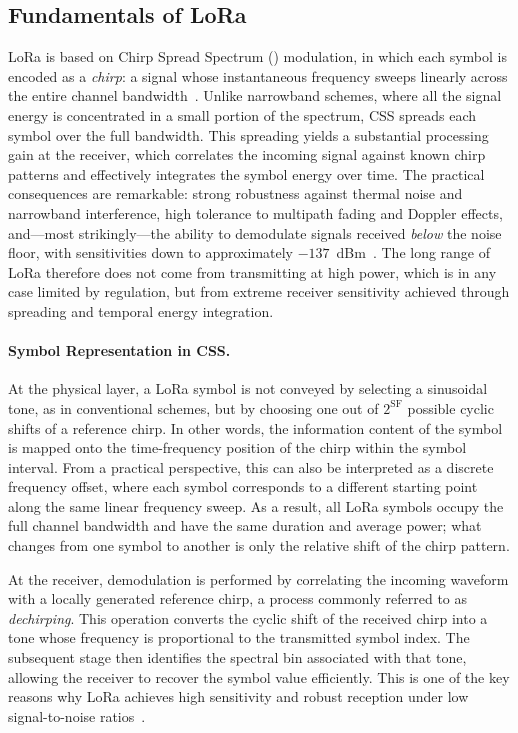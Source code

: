 \documentclass[english,bachelor]{tfgitic}[2026/01/22]
\begin{document}
\subsection{Fundamentals of LoRa}

LoRa is based on Chirp Spread Spectrum () modulation, in which each symbol is encoded as a \emph{chirp}: a signal whose instantaneous frequency sweeps linearly across
the entire channel bandwidth~\cite{vangelista2017css}. Unlike narrowband schemes, where all the signal energy is concentrated in a small portion of the spectrum, 
CSS spreads each symbol over the full bandwidth. This spreading yields a substantial processing gain at the receiver, which correlates the incoming signal against 
known chirp patterns and effectively integrates the symbol energy over time. The practical consequences are remarkable: strong robustness against thermal noise and 
narrowband interference, high tolerance to multipath fading and Doppler effects, and---most strikingly---the ability to demodulate signals received 
\emph{below} the noise floor, with sensitivities down to approximately $-137$~dBm~\cite{semtech2015an1200,augustin2016study}. 
The long range of LoRa therefore does not come from transmitting at high power, which is in any case limited by regulation, but from extreme receiver 
sensitivity achieved through spreading and temporal energy integration.

\paragraph{Symbol Representation in CSS.}
At the physical layer, a LoRa symbol is not conveyed by selecting a sinusoidal tone, as in conventional  schemes, but by choosing one out of $2^{\mathrm{SF}}$ possible cyclic shifts of a reference chirp. In other words, the information content of the symbol is mapped onto the time-frequency position of the chirp within the symbol interval. From a practical perspective, this can also be interpreted as a discrete frequency offset, where each symbol corresponds to a different starting point along the same linear frequency sweep. As a result, all LoRa symbols occupy the full channel bandwidth and have the same duration and average power; what changes from one symbol to another is only the relative shift of the chirp pattern.


At the receiver, demodulation is performed by correlating the incoming waveform with a locally generated reference chirp, a process commonly referred to as \emph{dechirping}. This operation converts the cyclic shift of the received chirp into a tone whose frequency is proportional to the transmitted symbol index. The subsequent  stage then identifies the spectral bin associated with that tone, allowing the receiver to recover the symbol value efficiently. This is one of the key reasons why LoRa achieves high sensitivity and robust reception under low signal-to-noise ratios~\cite{wirelesspi_lora}.
\end{document}
